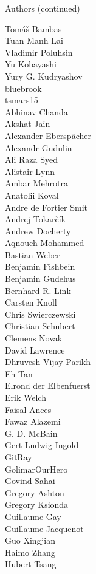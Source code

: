 \begin{frame}{Authors (continued)}
\begin{multicols}{5}
Tomáš Bambas\\
Tuan Manh Lai\\
Vladimir Poluhsin\\
Yu Kobayashi\\
Yury G. Kudryashov\\
bluebrook\\
tsmars15\\
Abhinav Chanda\\
Akshat Jain\\
Alexander Eberspächer\\
Alexandr Gudulin\\
Ali Raza Syed\\
Alistair Lynn\\
Ambar Mehrotra\\
Anatolii Koval\\
Andre de Fortier Smit\\
Andrej Tokarčík\\
Andrew Docherty\\
Aqnouch Mohammed\\
Bastian Weber\\
Benjamin Fishbein\\
Benjamin Gudehus\\
Bernhard R. Link\\
Carsten Knoll\\
Chris Swierczewski\\
Christian Schubert\\
Clemens Novak\\
David Lawrence\\
Dhruvesh Vijay Parikh\\
Eh Tan\\
Elrond der Elbenfuerst\\
Erik Welch\\
Faisal Anees\\
Fawaz Alazemi\\
G. D. McBain\\
Gert-Ludwig Ingold\\
GitRay\\
GolimarOurHero\\
Govind Sahai\\
Gregory Ashton\\
Gregory Ksionda\\
Guillaume Gay\\
Guillaume Jacquenot\\
Guo Xingjian\\
Haimo Zhang\\
Hubert Tsang\\

\end{multicols}
\end{frame}

